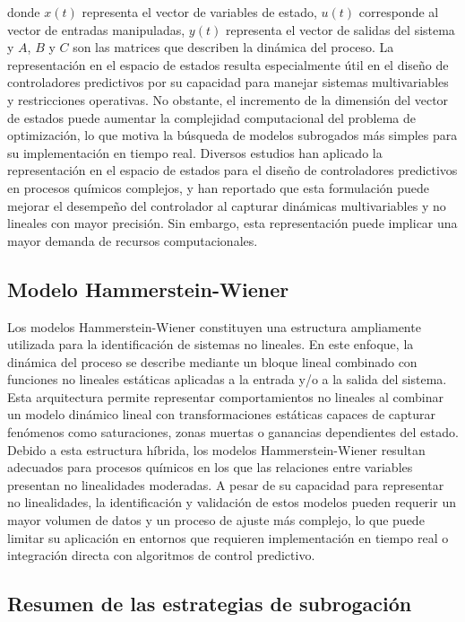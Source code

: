 donde $x(t)$ representa el vector de variables de estado, $u(t)$ corresponde al vector de entradas manipuladas, $y(t)$ representa el vector de salidas del sistema y $A$, $B$ y $C$ son las matrices que describen la dinámica del proceso. La representación en el espacio de estados resulta especialmente útil en el diseño de controladores predictivos por su capacidad para manejar sistemas multivariables y restricciones operativas. No obstante, el incremento de la dimensión del vector de estados puede aumentar la complejidad computacional del problema de optimización, lo que motiva la búsqueda de modelos subrogados más simples para su implementación en tiempo real. Diversos estudios han aplicado la representación en el espacio de estados para el diseño de controladores predictivos en procesos químicos complejos, y han reportado que esta formulación puede mejorar el desempeño del controlador al capturar dinámicas multivariables y no lineales con mayor precisión. Sin embargo, esta representación puede implicar una mayor demanda de recursos computacionales.

\subsection{Modelo Hammerstein-Wiener}

Los modelos Hammerstein-Wiener constituyen una estructura ampliamente utilizada para la identificación de sistemas no lineales. En este enfoque, la dinámica del proceso se describe mediante un bloque lineal combinado con funciones no lineales estáticas aplicadas a la entrada y/o a la salida del sistema. Esta arquitectura permite representar comportamientos no lineales al combinar un modelo dinámico lineal con transformaciones estáticas capaces de capturar fenómenos como saturaciones, zonas muertas o ganancias dependientes del estado. Debido a esta estructura híbrida, los modelos Hammerstein-Wiener resultan adecuados para procesos químicos en los que las relaciones entre variables presentan no linealidades moderadas. A pesar de su capacidad para representar no linealidades, la identificación y validación de estos modelos pueden requerir un mayor volumen de datos y un proceso de ajuste más complejo, lo que puede limitar su aplicación en entornos que requieren implementación en tiempo real o integración directa con algoritmos de control predictivo.

\subsection{Resumen de las estrategias de subrogación}


